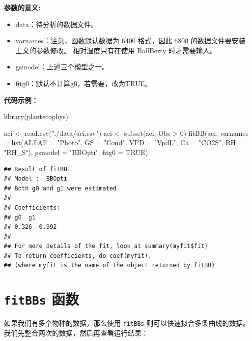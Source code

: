 \documentclass[
]{krantz}
\makeatletter
\newenvironment{Shaded}{\begin{snugshade}}{\end{snugshade}}
\newcommand{\AttributeTok}[1]{\textcolor[rgb]{0.77,0.63,0.00}{#1}}
\newcommand{\ConstantTok}[1]{\textcolor[rgb]{0.00,0.00,0.00}{#1}}
\newcommand{\DecValTok}[1]{\textcolor[rgb]{0.00,0.00,0.81}{#1}}
\newcommand{\FunctionTok}[1]{\textcolor[rgb]{0.00,0.00,0.00}{#1}}
\newcommand{\NormalTok}[1]{#1}
\newcommand{\OtherTok}[1]{\textcolor[rgb]{0.56,0.35,0.01}{#1}}
\newcommand{\SpecialCharTok}[1]{\textcolor[rgb]{0.00,0.00,0.00}{#1}}
\newcommand{\StringTok}[1]{\textcolor[rgb]{0.31,0.60,0.02}{#1}}
\providecommand{\tightlist}{%
  \setlength{\itemsep}{0pt}\setlength{\parskip}{0pt}}
\newenvironment{kframe}{%
\medskip{}
\setlength{\fboxsep}{.8em}
 \def\at@end@of@kframe{}%
 \ifinner\ifhmode%
  \def\at@end@of@kframe{\end{minipage}}%
  \begin{minipage}{\columnwidth}%
 \fi\fi%
 \def\FrameCommand##1{\hskip\@totalleftmargin \hskip-\fboxsep
 \colorbox{shadecolor}{##1}\hskip-\fboxsep
     \hskip-\linewidth \hskip-\@totalleftmargin \hskip\columnwidth}%
 \MakeFramed {\advance\hsize-\width
   \@totalleftmargin\z@ \linewidth\hsize
   \@setminipage}}%
 {\par\unskip\endMakeFramed%
 \at@end@of@kframe}
\renewenvironment{Shaded}{\begin{kframe}}{\end{kframe}}
\makeatother
\begin{document}
\textbf{参数的意义:}

\begin{itemize}
\tightlist
\item
  data：待分析的数据文件。
\item
  varnames：注意，函数默认数据为 6400 格式，因此 6800 的数据文件要安装上文的参数修改。 相对湿度只有在使用 BallBerry 时才需要输入。
\item
  gsmodel：上述三个模型之一。
\item
  fitg0：默认不计算g0，若需要，改为TRUE。
\end{itemize}

\textbf{代码示例：}

\begin{Shaded}
\begin{Highlighting}[]
\FunctionTok{library}\NormalTok{(plantecophys)}

\NormalTok{aci }\OtherTok{\textless{}{-}} \FunctionTok{read.csv}\NormalTok{(}\StringTok{"./data/aci.csv"}\NormalTok{)}
\NormalTok{aci }\OtherTok{\textless{}{-}} \FunctionTok{subset}\NormalTok{(aci, Obs }\SpecialCharTok{\textgreater{}} \DecValTok{0}\NormalTok{)}
\FunctionTok{fitBB}\NormalTok{(aci, }\AttributeTok{varnames =} \FunctionTok{list}\NormalTok{(}\AttributeTok{ALEAF =} \StringTok{"Photo"}\NormalTok{, }\AttributeTok{GS =} \StringTok{"Cond"}\NormalTok{, }\AttributeTok{VPD =} \StringTok{"VpdL"}\NormalTok{,}
  \AttributeTok{Ca =} \StringTok{"CO2S"}\NormalTok{, }\AttributeTok{RH =} \StringTok{"RH\_S"}\NormalTok{), }\AttributeTok{gsmodel =} \StringTok{"BBOpti"}\NormalTok{, }\AttributeTok{fitg0 =} \ConstantTok{TRUE}\NormalTok{)}
\end{Highlighting}
\end{Shaded}

\begin{verbatim}
## Result of fitBB.
## Model :  BBOpti 
## Both g0 and g1 were estimated.
## 
## Coefficients:
## g0  g1
## 0.326 -0.992 
## 
## For more details of the fit, look at summary(myfit$fit)
## To return coefficients, do coef(myfit).
## (where myfit is the name of the object returned by fitBB)
\end{verbatim}

\hypertarget{fitbbs}{%
\section{\texorpdfstring{\texttt{fitBBs} 函数}{fitBBs 函数}}\label{fitbbs}}

如果我们有多个物种的数据，那么使用 \texttt{fitBBs} 则可以快速拟合多条曲线的数据。我们先整合两次的数据，然后再查看运行结果：
\end{document}
